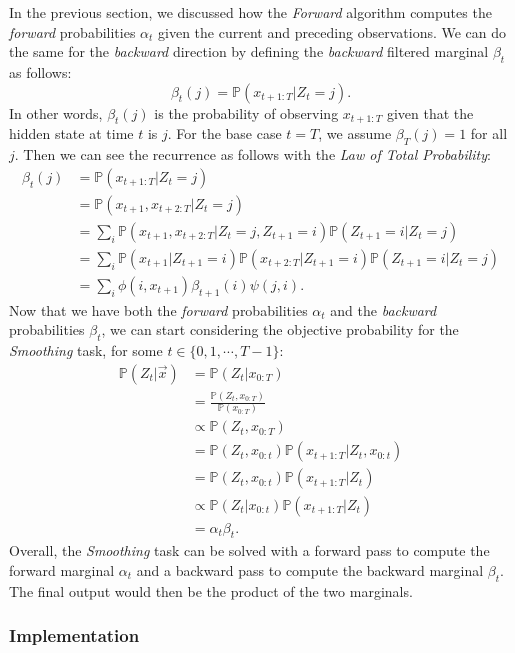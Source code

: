 \documentclass{article}
\theoremstyle{definition}
\renewcommand{\P}{\mathbb{P}}
\begin{document}
In the previous section, we discussed how the \textit{Forward} algorithm computes the \textit{forward} probabilities \(\alpha_t\) given the current and preceding observations. We can do the same for the \textit{backward} direction by defining the \textit{backward} filtered marginal \(\beta_t\) as follows:
\[\beta_t(j) = \P(x_{t + 1:T} | Z_t = j).\]
In other words, \(\beta_t(j)\) is the probability of observing \(x_{t+1:T}\) given that the hidden state at time \(t\) is \(j\). For the base case \(t = T\), we assume \(\beta_T(j) = 1\) for all \(j\). Then we can see the recurrence as follows with the \textit{Law of Total Probability}:
\begin{align*}
    \beta_t(j) &= \P(x_{t+1:T} | Z_t = j) \\
    &= \P(x_{t+1}, x_{t+2:T} | Z_t = j) \\
    &= \sum_i \P(x_{t+1}, x_{t+2:T} | Z_t = j, Z_{t+1}=i) \P(Z_{t+1} = i | Z_t = j) \\
    &= \sum_i \P(x_{t+1}|Z_{t+1} = i) \P(x_{t+2:T}|Z_{t+1}=i)\P(Z_{t+1} = i | Z_t = j) \\
    &= \sum_i \phi(i, x_{t+1}) \beta_{t+1}(i) \psi(j, i).
\end{align*}
Now that we have both the \textit{forward} probabilities \(\alpha_t\) and the \textit{backward} probabilities \(\beta_t\), we can start considering the objective probability for the \textit{Smoothing} task, for some \(t \in \{0, 1, \cdots, T-1\}\):
\begin{align*}
    \P(Z_t | \vec x) &= \P(Z_t | x_{0:T}) \\
    &= \frac{\P(Z_t, x_{0:T})}{\P(x_{0:T})} \\
    &\propto \P(Z_t, x_{0:T}) \\
    &= \P(Z_t, x_{0:t}) \P(x_{t+1:T} | Z_t, x_{0:t}) \\
    &= \P(Z_t, x_{0:t}) \P(x_{t+1:T} | Z_t) \\
    &\propto \P(Z_t | x_{0:t}) \P(x_{t+1:T} | Z_t) \\
    &= \alpha_t \beta_t.
\end{align*}
Overall, the \textit{Smoothing} task can be solved with a forward pass to compute the forward marginal \(\alpha_t\) and a backward pass to compute the backward marginal \(\beta_t\). The final output would then be the product of the two marginals.

\subsubsection{Implementation}
\end{document}
